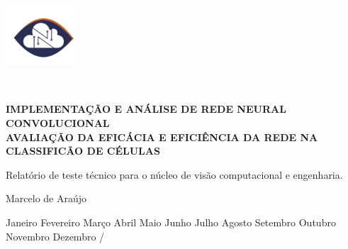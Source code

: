 
\begin{center}
\includegraphics[width=0.2\textwidth]{figuras/nuven.png}

\\

\vspace{3cm}

\uppercase{\textbf{ Implementação e Análise de Rede Neural Convolucional}}\\[2cm]

\uppercase{\textbf{
Avaliação da eficácia e eficiência da rede na classificão de células}}\\[1cm]

\end{center}

\vspace{0.2cm}
\begin{center}
    
\begin{minipage}{13cm}

Relatório de teste técnico para o núcleo de visão computacional e engenharia.

\end{minipage}
\end{center}

\begin{center}
\vfill
\vspace{0.2cm}

Marcelo de Araújo\\

\newcommand{\mes}{\ifcase\month\or 
    Janeiro \or Fevereiro \or Março \or Abril \or Maio \or Junho \or 
    Julho \or Agosto \or Setembro \or Outubro \or Novembro \or 
    Dezembro \fi}
    
\def\ano{\expandafter\YEAR\the\year}
\def\YEAR#1#2#3#4{#1#2#3#4}
    
{ \mes / \ano}


\end{center}
